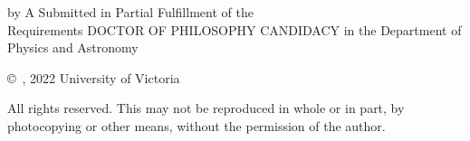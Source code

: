 \pagebreak
{
	\centering
	\thesistitle
	\tpbreak
	by
	\tpbreak
	\nameanddegrees
	\tpbreak
	A \PhDorMas Submitted in Partial Fulfillment of the \\
	Requirements 
	\tpbreak
	DOCTOR OF PHILOSOPHY CANDIDACY
	\tpbreak
	in the Department of Physics and Astronomy\\
	\vfill
	\begin{center}
		\copyright\ \yourname, 2022 \linebreak
		\phantom{\copyright} University of Victoria
	\end{center}
	All rights reserved. This \PhDorMas may not be reproduced in whole or in part, by \\
	\hfill photocopying or other means, without the permission of the author. 
	\hfill
}
\pagebreak
